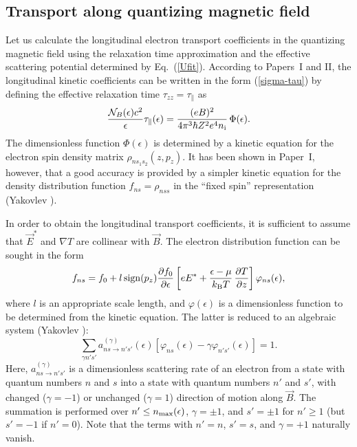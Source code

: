 \documentclass{aa}
\newcommand{\beq}{\begin{equation}}
\newcommand{\eeq}{\end{equation}}
\newcommand{\req}[1]{Eq.~(\ref{#1})}
\newcommand{\kB}{k_{\rm B}}
\newcommand{\Ne}{{\cal N}_B(\epsilon)}
\newcommand{\dfde}{{\partial f_0 \over\partial\epsilon}}
\begin{document}
\subsection{Transport along quantizing magnetic field}
%
Let us calculate the longitudinal
electron transport coefficients in the quantizing magnetic field
using the relaxation time
approximation and the effective scattering potential
determined by \req{Ufit}. According to Papers~I and II,
the longitudinal kinetic coefficients
can be written in the form (\ref{sigma-tau})
by defining the effective relaxation time
$\tau_{zz} = \tau_\|$ as
\beq
  {\Ne c^2\over\epsilon} \tau_\|(\epsilon) =
      {(e B)^2 \over 4\pi^3\hbar Z^2 e^4 n_{\rm i}}\,\Phi(\epsilon).
\label{Phi1}
\eeq
The dimensionless function $\Phi(\epsilon)$ is determined by
a kinetic equation for the electron spin density matrix
$\rho_{n s_1 s_2}(z,p_z)$.
It has been shown in Paper~I, however,
that a good accuracy is provided by
a simpler kinetic equation
for the density distribution function
$f_{ns}=\rho_{n s s}$
in the ``fixed spin'' representation (Yakovlev \cite{yak84}).

In order to obtain the longitudinal transport coefficients,
it is sufficient to assume that $\vec{E}^\ast$ and $\nabla T$
are collinear with $\vec{B}$.
The electron distribution function can be sought in the form
\beq
   f_{ns} = f_0 + l\,{\rm sign} (p_z) \dfde
       \left[ e E^\ast + {\epsilon - \mu \over \kB T}\,
       {\partial T \over\partial z} \right] \varphi_{ns}(\epsilon),
\eeq
where $l$ is an appropriate scale length, and $\varphi(\epsilon)$
is a dimensionless function to be determined from the kinetic equation.
The latter is reduced to an algebraic system (Yakovlev \cite{yak84}):
\beq
   \sum_{\gamma n's'} a^{(\gamma)}_{ns\to n's'}(\epsilon)
        \left[ \varphi_{ns}(\epsilon)
           - \gamma\varphi_{n's'}(\epsilon) \right] = 1.
\label{systemPhi}
\eeq
Here, $a^{(\gamma)}_{ns\to n's'}$ is a dimensionless
scattering rate of an electron
from a state with quantum numbers $n$ and $s$
into a state with quantum numbers $n'$ and $s'$, with
changed ($\gamma=-1$) or unchanged ($\gamma=1$)
direction of motion along $\vec{B}$.
The summation is performed over $n'\leq n_{\rm max}(\epsilon)$,
$\gamma = \pm1$, and $s'=\pm1$ for $n'\geq1$
(but $s'=-1$ if $n'=0$).
Note that the terms with $n'=n$, $s'=s$, and $\gamma=+1$
naturally vanish.
\end{document}
